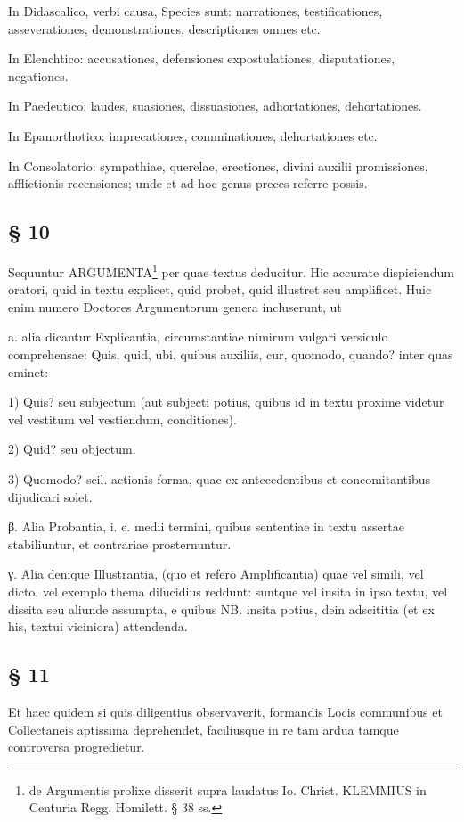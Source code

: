 In Didascalico, verbi causa, Species sunt: narrationes, testificationes, asseverationes, demonstrationes, descriptiones omnes etc.

In Elenchtico: accusationes, defensiones expostulationes, disputationes, negationes.

In Paedeutico: laudes, suasiones, dissuasiones, adhortationes, dehortationes.

In Epanorthotico: imprecationes, comminationes, dehortationes etc.

In Consolatorio: sympathiae, querelae, erectiones, divini auxilii promissiones, afflictionis recensiones; unde et ad hoc genus preces referre possis.

\subsection{§ 10}

Sequuntur ARGUMENTA\footnote{de Argumentis prolixe disserit supra laudatus Io. Christ. KLEMMIUS in Centuria Regg. Homilett. § 38 ss.} per quae textus deducitur. Hic accurate dispiciendum oratori, quid in textu explicet, quid probet, quid illustret seu amplificet. Huic enim numero Doctores Argumentorum genera incluserunt, ut

a. alia dicantur Explicantia, circumstantiae nimirum vulgari versiculo comprehensae: Quis, quid, ubi, quibus auxiliis, cur, quomodo, quando? inter quas eminet:

1) Quis? seu subjectum (aut subjecti potius, quibus id in textu proxime videtur vel vestitum vel vestiendum, conditiones).

2) Quid? seu objectum.

3) Quomodo? scil. actionis forma, quae ex antecedentibus et concomitantibus dijudicari solet.

β. Alia Probantia, i. e. medii termini, quibus sententiae in textu assertae stabiliuntur, et contrariae prosternuntur.

γ. Alia denique Illustrantia, (quo et refero Amplificantia) quae vel simili, vel dicto, vel exemplo thema dilucidius reddunt: suntque vel insita in ipso textu, vel dissita seu aliunde assumpta, e quibus NB. insita potius, dein adscititia (et ex his, textui viciniora) attendenda.

\subsection{§ 11}

Et haec quidem si quis diligentius observaverit, formandis Locis communibus et Collectaneis aptissima deprehendet, faciliusque in re tam ardua tamque controversa progredietur.

